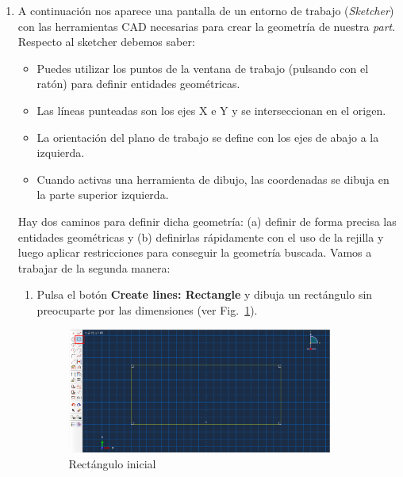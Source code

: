 \begin{enumerate}
\item A continuación nos aparece una pantalla de un entorno de trabajo
  (\textit{Sketcher}) con las herramientas CAD necesarias para crear
  la geometría de nuestra \textit{part}. Respecto al sketcher debemos
  saber:
  \begin{itemize}
  \item Puedes utilizar los puntos de la ventana de trabajo (pulsando
    con el ratón) para definir entidades geométricas.
  \item Las líneas punteadas son los ejes X e Y y se interseccionan en
    el origen.
  \item La orientación del plano de trabajo se define con los ejes de
    abajo a la izquierda.
  \item Cuando activas una herramienta de dibujo, las coordenadas se
    dibuja en la parte superior izquierda.
  \end{itemize}


  Hay dos caminos para definir dicha geometría: (a) definir de forma
  precisa las entidades geométricas y (b) definirlas rápidamente con el
  uso de la rejilla y luego aplicar restricciones para conseguir la
  geometría buscada. Vamos a trabajar de la segunda manera:
  \begin{enumerate}
  \item Pulsa el botón \textbf{Create lines: Rectangle} y dibuja un
    rectángulo sin preocuparte por las dimensiones (ver
    Fig.~\ref{figu05}).
    \begin{figure}[H]
      \begin{center}
        \includegraphics[width=0.875\textwidth]{./body/images/imagen05.pdf}
      \end{center}
      \caption{ Rectángulo inicial}
      \label{figu05}
    \end{figure}


\end{enumerate}
\end{enumerate}

